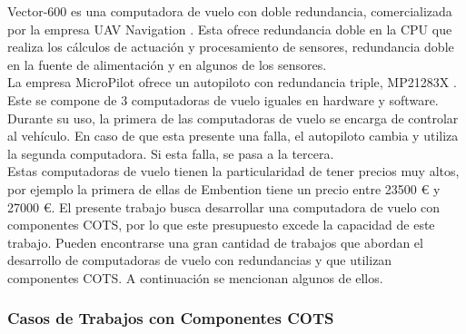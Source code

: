 Vector-600 es una computadora de vuelo con doble redundancia, comercializada por la empresa UAV Navigation \cite{uav-navigation-vector-600}. Esta ofrece redundancia doble en la CPU que realiza los cálculos de actuación y procesamiento de sensores, redundancia doble en la fuente de alimentación y en algunos de los sensores.\\

La empresa MicroPilot ofrece un autopiloto con redundancia triple, MP21283X \cite{wwwmicropilotcom-no-date}. Este se compone de 3 computadoras de vuelo iguales en hardware y software. Durante su uso, la primera de las computadoras de vuelo se encarga de controlar al vehículo. En caso de que esta presente una falla, el autopiloto cambia y utiliza la segunda computadora. Si esta falla, se pasa a la tercera.\\

Estas computadoras de vuelo tienen la particularidad de tener precios muy altos, por ejemplo la primera de ellas de Embention tiene un precio entre 23500 \euro{} y 27000 \euro{}. El presente trabajo busca desarrollar una computadora de vuelo con componentes COTS, por lo que este presupuesto excede la capacidad de este trabajo. Pueden encontrarse una gran cantidad de trabajos que abordan el desarrollo de computadoras de vuelo con redundancias y que utilizan componentes COTS. A continuación se mencionan algunos de ellos.\\

\subsubsection{Casos de Trabajos con Componentes COTS}

